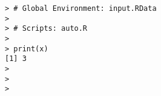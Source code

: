 \begin{Verbatim}
> # Global Environment: input.RData
> 
> # Scripts: auto.R
> 
> print(x)
[1] 3
> 
> 
> 
\end{Verbatim}
